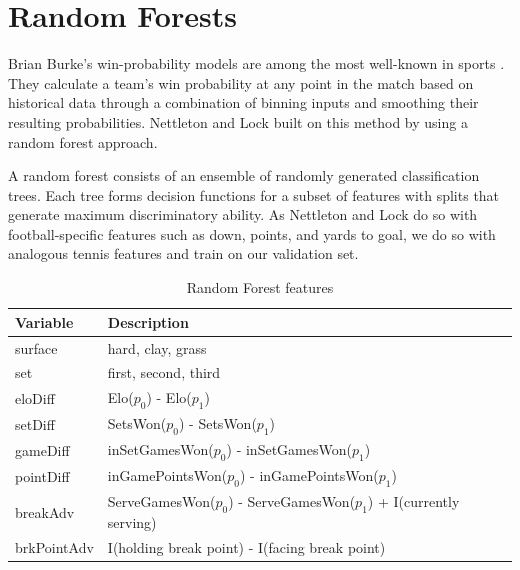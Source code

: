 \documentclass[chapterprefix=false]{report}
\begin{document}



\section{Random Forests}
Brian Burke's win-probability models are among the most well-known in sports \cite{WPexp}. They calculate a team's win probability at any point in the match based on historical data through a combination of binning inputs and smoothing their resulting probabilities. Nettleton and Lock built on this method by using a random forest approach.

A random forest consists of an ensemble of randomly generated classification trees. Each tree forms decision functions for a subset of features with splits that generate maximum discriminatory ability. As Nettleton and Lock do so with football-specific features such as down, points, and yards to goal, we do so with analogous tennis features and train on our validation set.



\begin{table}[H]
\centering
\caption{Random Forest features}
\label{my-label}
\begin{tabular}{ll}
 \hline
 Variable & Description \\
 \hline
 surface & hard, clay, grass \\
 \hline
 set &  first, second, third \\
 \hline
 eloDiff &  Elo($p_0$) - Elo($p_1$) \\
 \hline
  setDiff &  SetsWon($p_0$) - SetsWon($p_1$)\\
 \hline
 gameDiff &  inSetGamesWon($p_0$) - inSetGamesWon($p_1$)\\
 \hline
 pointDiff &  inGamePointsWon($p_0$) - inGamePointsWon($p_1$)\\
 \hline
  breakAdv &  ServeGamesWon($p_0$) - ServeGamesWon($p_1$) + I(currently serving)\\
 \hline
 brkPointAdv & I(holding break point) - I(facing break point)\\
 \hline
\end{tabular}
\end{table}
\end{document}
